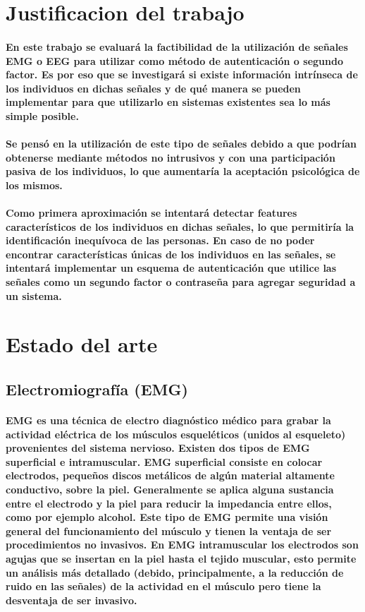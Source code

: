 \documentclass{article}
\begin{document}
\section{Justificacion del trabajo}
\paragraph{
En este trabajo se evaluará la factibilidad de la utilización de señales EMG o EEG para utilizar como método de autenticación o segundo factor. Es por eso que se investigará si existe información intrínseca de los individuos en dichas señales y de qué manera se pueden implementar para que utilizarlo en sistemas existentes sea lo más simple posible.
}
\paragraph{
Se pensó en la utilización de este tipo de señales debido a que podrían obtenerse mediante métodos no intrusivos y con una participación pasiva de los individuos, lo que aumentaría la aceptación psicológica de los mismos.
}
\paragraph{
Como primera aproximación se intentará detectar features característicos de los individuos en dichas señales, lo que permitiría la identificación inequívoca de las personas. En caso de no poder encontrar características únicas de los individuos en las señales, se intentará implementar un esquema de autenticación que utilice las señales como un segundo factor o contraseña para agregar seguridad a un sistema.
}

\section{Estado del arte}
\subsection{Electromiografía (EMG)}
\paragraph{
EMG es una técnica de electro diagnóstico médico para grabar la actividad eléctrica de los músculos esqueléticos (unidos al esqueleto) provenientes del sistema nervioso. Existen dos tipos de EMG superficial e intramuscular. EMG superficial consiste en colocar electrodos, pequeños discos metálicos de algún material altamente conductivo, sobre la piel. Generalmente se aplica alguna sustancia entre el electrodo y la piel para reducir la impedancia entre ellos, como por ejemplo alcohol. Este tipo de EMG permite una visión general del funcionamiento del músculo y tienen la ventaja de ser procedimientos no invasivos. En EMG intramuscular los electrodos son agujas que se insertan en la piel hasta el tejido muscular, esto permite un análisis más detallado (debido, principalmente, a la reducción de ruido en las señales) de la actividad en el músculo pero tiene la desventaja de ser invasivo.
}
\end{document}
